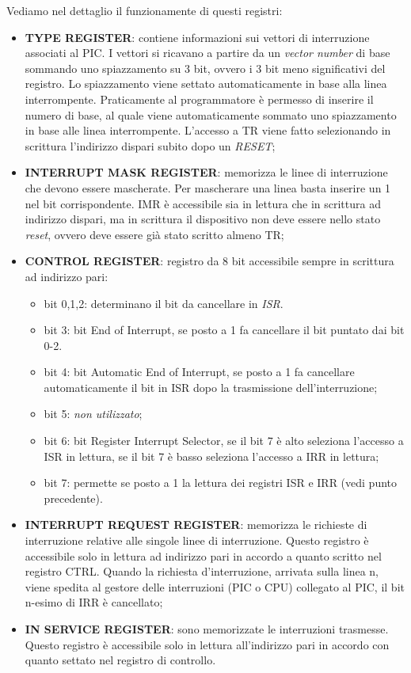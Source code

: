 Vediamo nel dettaglio il funzionamente di questi registri:
\begin{itemize}
    \item \textbf{TYPE REGISTER}: contiene informazioni sui vettori di interruzione associati al PIC. I vettori si ricavano a partire da un \textit{vector number} di base sommando uno spiazzamento su 3 bit, ovvero i 3 bit meno significativi del registro. Lo spiazzamento viene settato automaticamente in base alla linea interrompente. Praticamente al programmatore è permesso di inserire il numero di base, al quale viene automaticamente sommato uno spiazzamento in base alle linea interrompente.  L’accesso a TR viene fatto selezionando in scrittura  l’indirizzo dispari subito dopo un \textit{RESET};
    \item \textbf{INTERRUPT MASK REGISTER}: memorizza le linee di interruzione che devono essere mascherate. Per mascherare una linea basta inserire un 1 nel bit corrispondente. IMR è accessibile sia in lettura che in scrittura ad indirizzo dispari, ma in scrittura il dispositivo non deve essere nello stato \textit{reset}, ovvero deve essere già stato scritto almeno TR;
    \item \textbf{CONTROL REGISTER}: registro da 8 bit accessibile sempre in scrittura ad indirizzo pari:
    \begin{itemize}
        \item bit 0,1,2: determinano il bit da cancellare in \textit{ISR}.
        \item bit 3: bit End of Interrupt, se posto a 1 fa cancellare il bit puntato dai bit 0-2. 
        \item bit 4: bit Automatic End of Interrupt, se posto a 1 fa cancellare automaticamente il bit in ISR dopo la trasmissione dell'interruzione;
        \item bit 5: \textit{non utilizzato};
        \item bit 6: bit Register Interrupt Selector, se il bit 7 è alto seleziona l'accesso a ISR in lettura, se il bit 7 è basso seleziona l'accesso a IRR in lettura;
        \item bit 7: permette se posto a 1 la lettura dei registri ISR e IRR (vedi punto precedente).
    \end{itemize}
    \item \textbf{INTERRUPT REQUEST REGISTER}: memorizza le richieste di interruzione relative alle singole linee di interruzione. Questo registro è accessibile solo in lettura ad indirizzo pari in accordo a quanto scritto nel registro CTRL. 
    Quando la richiesta d'interruzione, arrivata sulla linea n, viene spedita al gestore delle interruzioni (PIC o CPU) collegato al PIC, il bit n-esimo di IRR è cancellato;
    \item \textbf{IN SERVICE REGISTER}: sono memorizzate le interruzioni trasmesse.  Questo registro è accessibile solo in lettura all'indirizzo pari in accordo con quanto settato nel registro di controllo. 
\end{itemize}

